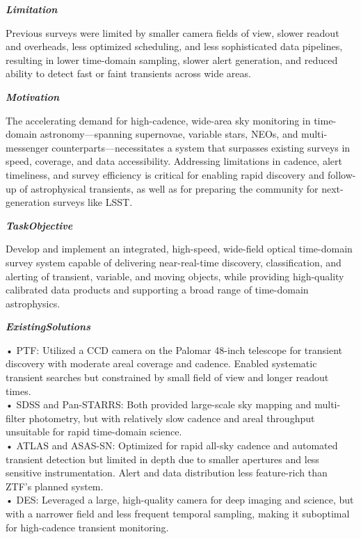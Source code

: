 \begin{tcolorbox}[
    breakable,
    title={Example of Idea Generation in Astronomy},
    colback=LighterGray,
    colframe=DeepPurple,
    colbacktitle=DeepPurple,
    coltitle=White,
]
\textbf{\emph{\textcolor{CaseOrange}{Limitation}}}

Previous surveys were limited by smaller camera fields of view, slower readout and overheads, less
optimized scheduling, and less sophisticated data pipelines, resulting in lower time-domain
sampling, slower alert generation, and reduced ability to detect fast or faint transients across
wide areas.

\textbf{\emph{\textcolor{CaseOrange}{Motivation}}}

The accelerating demand for high-cadence, wide-area sky monitoring in time-domain astronomy—spanning
supernovae, variable stars, NEOs, and multi-messenger counterparts—necessitates a system that
surpasses existing surveys in speed, coverage, and data accessibility. Addressing limitations in
cadence, alert timeliness, and survey efficiency is critical for enabling rapid discovery and
follow-up of astrophysical transients, as well as for preparing the community for next-generation
surveys like LSST.

\textbf{\emph{\textcolor{CaseOrange}{TaskObjective}}}

Develop and implement an integrated, high-speed, wide-field optical time-domain survey system
capable of delivering near-real-time discovery, classification, and alerting of transient, variable,
and moving objects, while providing high-quality calibrated data products and supporting a broad
range of time-domain astrophysics.

\textbf{\emph{\textcolor{CaseOrange}{ExistingSolutions}}}

• PTF: Utilized a CCD camera on the Palomar 48-inch telescope for transient discovery with moderate areal coverage and cadence. Enabled systematic transient searches but constrained by small field of view and longer readout times. \\
• SDSS and Pan-STARRS: Both provided large-scale sky mapping and multi-filter photometry, but with relatively slow cadence and areal throughput unsuitable for rapid time-domain science. \\
• ATLAS and ASAS-SN: Optimized for rapid all-sky cadence and automated transient detection but limited in depth due to smaller apertures and less sensitive instrumentation. Alert and data distribution less feature-rich than ZTF's planned system. \\
• DES: Leveraged a large, high-quality camera for deep imaging and science, but with a narrower field and less frequent temporal sampling, making it suboptimal for high-cadence transient monitoring. 


\end{tcolorbox}
